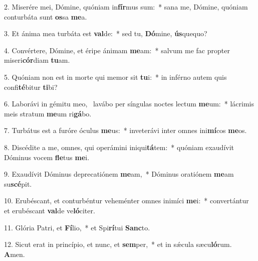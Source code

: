 2. Miserére mei, Dómine, quóniam in\textbf{fír}mus sum:~*  sana me, Dómine, quóniam conturbáta sunt \textbf{os}sa \textbf{me}a.\

3. Et ánima mea turbáta est \textbf{val}de:~*  sed tu, \textbf{Dó}mine, \textbf{ús}quequo?\

4. Convértere, Dómine, et éripe ánimam \textbf{me}am:~*  salvum me fac propter miseri\textbf{cór}diam \textbf{tu}am.\

5. Quóniam non est in morte qui memor sit \textbf{tu}i:~*  in inférno autem quis confi\textbf{té}bitur \textbf{ti}bi?\

6. Laborávi in gémitu meo, \dag\  lavábo per síngulas noctes lectum \textbf{me}um:~*  lácrimis meis stratum \textbf{me}um ri\textbf{gá}bo.\

7. Turbátus est a furóre óculus \textbf{me}us:~*  inveterávi inter omnes ini\textbf{mí}cos \textbf{me}os.\

8. Discédite a me, omnes, qui operámini iniqui\textbf{tá}tem:~*  quóniam exaudívit Dóminus vocem \textbf{fle}tus \textbf{me}i.\

9. Exaudívit Dóminus deprecatiónem \textbf{me}am,~*  Dóminus oratiónem \textbf{me}am su\textbf{scé}pit.\

10. Erubéscant, et conturbéntur veheménter omnes inimíci \textbf{me}i:~*  convertántur et erubéscant \textbf{val}de ve\textbf{ló}citer.\

11. Glória Patri, et \textbf{Fí}lio,~*  et Spi\textbf{rí}tui \textbf{Sanc}to.\

12. Sicut erat in princípio, et nunc, et \textbf{sem}per,~*  et in sǽcula sæcu\textbf{ló}rum. \textbf{A}men.\

